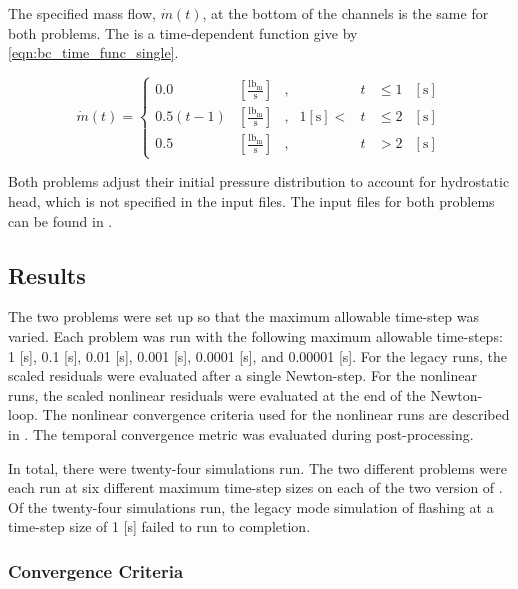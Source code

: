 The specified mass flow, $\dot{m}(t)$, at the bottom of the channels is the same for both problems. 
The is a time-dependent function give by \eqref{eqn:bc_time_func_single}.

\begin{equation}
\label{eqn:bc_time_func_single}
\dot{m}(t) = \left\{
\begin{array}{cclrcll}
 0.0           & [\frac{\text{lb}_{\text{m}}}{\text{s}}] & , &         & t & \leq 1 &[\text{s}] \\
 0.5 ( t - 1)  & [\frac{\text{lb}_{\text{m}}}{\text{s}}] & , & 1 [\text{s}] < & t & \leq 2 &[\text{s}] \\
 0.5           & [\frac{\text{lb}_{\text{m}}}{\text{s}}] & , &         & t & > 2    &[\text{s}]
\end{array}\right.
\end{equation}

Both problems adjust their initial pressure distribution to account for hydrostatic head, which is not specified in the input files.
The \cobra{} input files for both problems can be found in .

\subsection{Results}
\label{subsect:results}

The two problems were set up so that the maximum allowable time-step was varied.
Each problem was run with the following maximum allowable time-steps: 1 [s], 0.1 [s], 0.01 [s], 0.001 [s], 0.0001 [s], and 0.00001 [s]. 
For the legacy runs, the scaled residuals were evaluated after a single Newton-step.
For the nonlinear runs, the scaled nonlinear residuals were evaluated at the end of the Newton-loop.
The nonlinear convergence criteria used for the nonlinear runs are described in .
The temporal convergence metric was evaluated during post-processing.

In total, there were twenty-four simulations run.
The two different problems were each run at six different maximum time-step sizes on each of the two version of \cobra.
Of the twenty-four simulations run, the legacy mode simulation of flashing at a time-step size of 1 [s] failed to run to completion.

\subsubsection{Convergence Criteria}
\label{sect:result_temporal_convergence}

